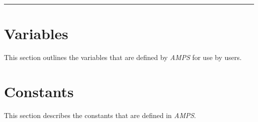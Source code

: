 

\noindent\rule{\textwidth}{1mm}

\section{Variables}
\label{Variables}

This section outlines the variables that are defined by {\em AMPS} for
use by users.




\newpage

\section{Constants}
\label{Constants}


This section describes the constants that are defined in {\em AMPS}.



